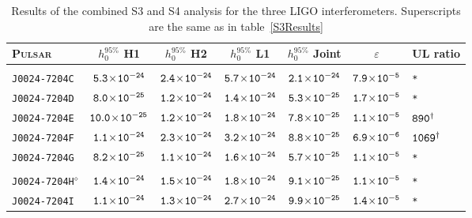 \begin{longtable}{l | c | c | c | c | c | l}
\caption[Results of the combined S3 and S4 analysis for the three LIGO
interferometers.]{\label{S3S4Results} Results of the combined S3 and S4 analysis for the three
LIGO interferometers. Superscripts are the same as in table~\ref{S3Results}} \\
\footnotesize{P\textsc{ulsar}} & \footnotesize{$h_0^{95\%}$ H1} & \footnotesize{$h_0^{95\%}$ H2} &
\footnotesize{$h_0^{95\%}$ L1} & \footnotesize{$h_0^{95\%}$ Joint} & \footnotesize{$\varepsilon$} &
\footnotesize{UL ratio} \\ 
\hline \hline \\[-24pt] 
\scriptsize{\tt{J0024-7204C}} & \scriptsize{$\tt{5.3\!\times\!10^{-24}}$} & \scriptsize{$\tt{2.4\!\times\!10^{-24}}$} & \scriptsize{$\tt{5.7\!\times\!10^{-24}}$} & \scriptsize{$\tt{2.1\!\times\!10^{-24}}$} & \scriptsize{$\tt{7.9\!\times\!10^{-5}}$} & \scriptsize{\tt{*}} \\[-16pt] 
\scriptsize{\tt{J0024-7204D}} & \scriptsize{$\tt{8.0\!\times\!10^{-25}}$} & \scriptsize{$\tt{1.2\!\times\!10^{-24}}$} & \scriptsize{$\tt{1.4\!\times\!10^{-24}}$} & \scriptsize{$\tt{5.3\!\times\!10^{-25}}$} & \scriptsize{$\tt{1.7\!\times\!10^{-5}}$} & \scriptsize{\tt{*}} \\[-16pt] 
\scriptsize{\tt{J0024-7204E}} & \scriptsize{$\tt{10.0\!\times\!10^{-25}}$} & \scriptsize{$\tt{1.2\!\times\!10^{-24}}$} & \scriptsize{$\tt{1.8\!\times\!10^{-24}}$} & \scriptsize{$\tt{7.8\!\times\!10^{-25}}$} & \scriptsize{$\tt{1.1\!\times\!10^{-5}}$} & \scriptsize{$\tt{890^{\dagger}}$} \\[-16pt] 
\scriptsize{\tt{J0024-7204F}} & \scriptsize{$\tt{1.1\!\times\!10^{-24}}$} & \scriptsize{$\tt{2.3\!\times\!10^{-24}}$} & \scriptsize{$\tt{3.2\!\times\!10^{-24}}$} & \scriptsize{$\tt{8.8\!\times\!10^{-25}}$} & \scriptsize{$\tt{6.9\!\times\!10^{-6}}$} & \scriptsize{$\tt{1069^{\dagger}}$} \\[-16pt] 
\scriptsize{\tt{J0024-7204G}} & \scriptsize{$\tt{8.2\!\times\!10^{-25}}$} & \scriptsize{$\tt{1.1\!\times\!10^{-24}}$} & \scriptsize{$\tt{1.6\!\times\!10^{-24}}$} & \scriptsize{$\tt{5.7\!\times\!10^{-25}}$} & \scriptsize{$\tt{1.1\!\times\!10^{-5}}$} & \scriptsize{\tt{*}} \\[-16pt] 
\\[-20pt] 
\scriptsize{\tt{J0024-7204H}$^{\diamond}$} & \scriptsize{$\tt{1.4\!\times\!10^{-24}}$} &
\scriptsize{$\tt{1.5\!\times\!10^{-24}}$} & \scriptsize{$\tt{1.8\!\times\!10^{-24}}$} & \scriptsize{$\tt{9.1\!\times\!10^{-25}}$}
& \scriptsize{$\tt{1.1\!\times\!10^{-5}}$} & \scriptsize{\tt{*}} \\[-16pt] 
\scriptsize{\tt{J0024-7204I}} & \scriptsize{$\tt{1.1\!\times\!10^{-24}}$} & \scriptsize{$\tt{1.3\!\times\!10^{-24}}$} & \scriptsize{$\tt{2.7\!\times\!10^{-24}}$} & \scriptsize{$\tt{9.9\!\times\!10^{-25}}$} & \scriptsize{$\tt{1.4\!\times\!10^{-5}}$} & \scriptsize{\tt{*}} \\[-16pt] 

\end{longtable}
